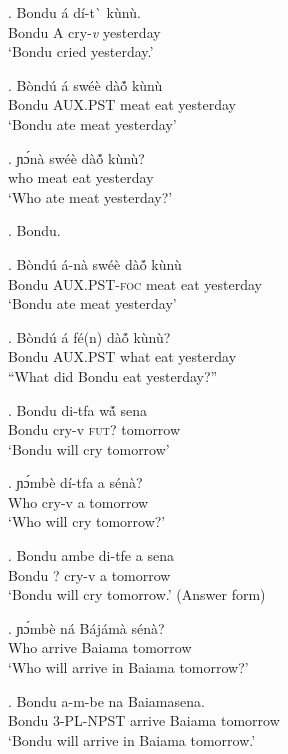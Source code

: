 \documentclass{assets/fieldnotes}
\begin{document}
\exg. Bondu \'{a} d\'{i}-t\`{} k\`{u}n\`{u}. \\
Bondu A cry-\textit{v} yesterday \\
`Bondu cried yesterday.'


\exg. Bòndú á swéè dàó̃ kùnù\\
Bondu AUX.PST meat eat yesterday \\%
    `Bondu ate meat yesterday'

\exg. ɲɔ́nà swéè dàó̃ kùnù?\\
who meat eat yesterday\\
`Who ate meat yesterday?'

\ex. Bondu.

\exg. Bòndú á-nà swéè dàó̃ kùnù\\
Bondu \textsc{AUX.PST-foc} meat eat yesterday \\%
    `Bondu ate meat yesterday'\\

\exg. Bòndú á fé(n) dàó̃ kùnù?\\
Bondu \textsc{AUX.PST} what eat yesterday\\
``What did Bondu eat yesterday?''




\exg. Bondu di-tfa w\'ã sena\\
Bondu cry-v \textsc{fut?} tomorrow\\
`Bondu will cry tomorrow'

\exg. ɲɔ́mbè dí-tfa a sénà?\\
Who cry-v a tomorrow\\
`Who will cry tomorrow?'

\exg. Bondu ambe di-tfe a sena\\
Bondu ? cry-v a tomorrow\\
`Bondu will cry tomorrow.' (Answer form)

\exg. ɲɔ́mbè ná Bájámà sénà?\\
Who arrive Baiama tomorrow\\
`Who will arrive in Baiama tomorrow?'

\exg. Bondu a-m-be na Baiamasena.\\
Bondu 3-PL-NPST arrive Baiama tomorrow\\
`Bondu will arrive in Baiama tomorrow.'
\end{document}
